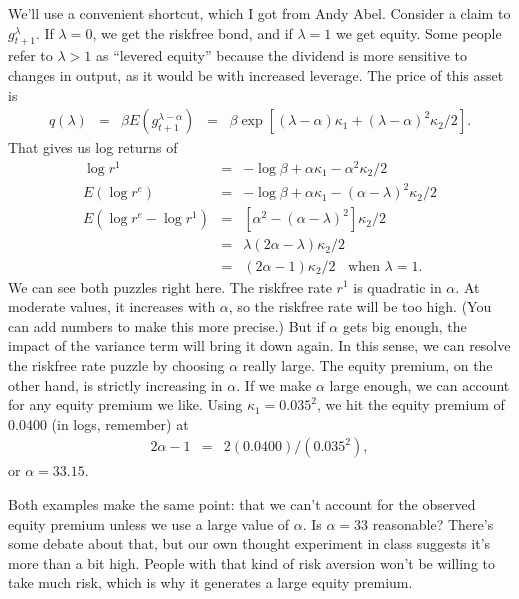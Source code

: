 \documentclass[11pt]{article}
\begin{document}
We'll use a convenient shortcut, which I got from Andy Abel.
Consider a claim to $g_{t+1}^\lambda$.
If $\lambda = 0$, we get the riskfree bond,
and if $\lambda = 1$ we get equity.
Some people refer to $\lambda>1$ as ``levered equity''
because the dividend is more sensitive to changes in output,
as it would be with increased leverage.
The price of this asset is
\begin{eqnarray*}
    q(\lambda) &=& \beta E \left( g_{t+1}^{\lambda-\alpha} \right)
            \;\;=\;\; \beta \exp \left[ (\lambda - \alpha) \kappa_1
                    + (\lambda-\alpha)^2 \kappa_2 /2 \right] .
\end{eqnarray*}
That gives us log returns of
\begin{eqnarray*}
   \log r^1  &=& - \log \beta + \alpha \kappa_1 - \alpha^2 \kappa_2/2 \\
   E (\log r^e ) &=& - \log \beta + \alpha \kappa_1 - (\alpha-\lambda)^2 \kappa_2/2 \\
   E (\log r^e - \log r^1 )
        &=& [ \alpha^2 -  (\alpha-\lambda)^2 ] \kappa_2/2  \\
        &=& \lambda (2 \alpha -\lambda)  \kappa_2/2  \\
        &=& (2\alpha - 1)  \kappa_2/2 \;\; \mbox{ when } \lambda = 1 .
\end{eqnarray*}
We can see both puzzles right here.
The riskfree rate $r^1$ is quadratic in $\alpha$.
At moderate values, it increases with $\alpha$, so the riskfree rate will be too high.
(You can add numbers to make this more precise.)
But if $\alpha$ gets big enough, the impact of the variance term will bring it down again.
In this sense, we can resolve the riskfree rate puzzle by choosing $\alpha$ really large.
The equity premium, on the other hand, is strictly increasing in $\alpha$.
If we make $\alpha$ large enough, we can account for any equity premium we like.
Using $\kappa_1 = 0.035^2 $,
we hit the equity premium of 0.0400 (in logs, remember) at
\begin{eqnarray*}
    2 \alpha - 1 &=& 2 (0.0400) / (0.035^2) ,
\end{eqnarray*}
or $\alpha = 33.15$.

Both examples make the same point:
that we can't account for the observed equity premium unless
we use a large value of $\alpha$.
Is $\alpha = 33$ reasonable?
There's some debate about that,
but our own thought experiment in class suggests it's more than a bit high.
People with that kind of risk aversion won't be willing to take much risk,
which is why it generates a large equity premium.
\end{document}
